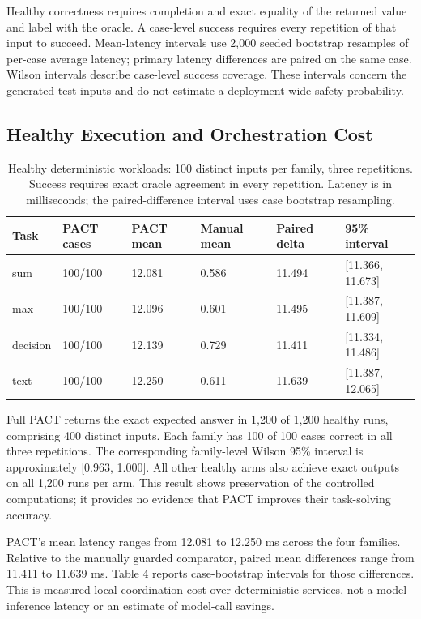 \documentclass[10pt,twocolumn,a4paper]{article}
\begin{document}
Healthy correctness requires completion and exact equality of the returned value and label with the oracle. A case-level success requires every repetition of that input to succeed. Mean-latency intervals use 2,000 seeded bootstrap resamples of per-case average latency; primary latency differences are paired on the same case. Wilson intervals describe case-level success coverage. These intervals concern the generated test inputs and do not estimate a deployment-wide safety probability.


\subsection{Healthy Execution and Orchestration Cost}

\begin{table}[t]
\centering
\caption{Healthy deterministic workloads: 100 distinct inputs per family, three repetitions. Success requires exact oracle agreement in every repetition. Latency is in milliseconds; the paired-difference interval uses case bootstrap resampling.}
\label{tab:healthy-extended}
\small
\setlength{\tabcolsep}{4pt}
\renewcommand{\arraystretch}{1.12}
\begin{tabularx}{\textwidth}{@{}Xlllll@{}}
\toprule
Task & PACT cases & PACT mean & Manual mean & Paired delta & 95\% interval\\
\midrule
sum & 100/100 & 12.081 & 0.586 & 11.494 & [11.366, 11.673]\\
max & 100/100 & 12.096 & 0.601 & 11.495 & [11.387, 11.609]\\
decision & 100/100 & 12.139 & 0.729 & 11.411 & [11.334, 11.486]\\
text & 100/100 & 12.250 & 0.611 & 11.639 & [11.387, 12.065]\\
\bottomrule
\end{tabularx}
\end{table}
Full PACT returns the exact expected answer in 1,200 of 1,200 healthy runs, comprising 400 distinct inputs. Each family has 100 of 100 cases correct in all three repetitions. The corresponding family-level Wilson 95\% interval is approximately [0.963, 1.000]. All other healthy arms also achieve exact outputs on all 1,200 runs per arm. This result shows preservation of the controlled computations; it provides no evidence that PACT improves their task-solving accuracy.


PACT's mean latency ranges from 12.081 to 12.250 ms across the four families. Relative to the manually guarded comparator, paired mean differences range from 11.411 to 11.639 ms. Table 4 reports case-bootstrap intervals for those differences. This is measured local coordination cost over deterministic services, not a model-inference latency or an estimate of model-call savings.
\end{document}
